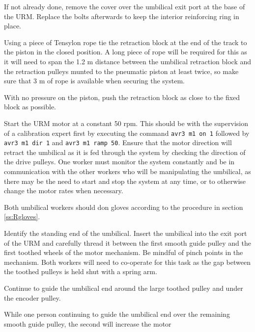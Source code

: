 \documentclass[11pt]{article}
\begin{document}
\begin{answerlist}
\item If not already done, remove the cover over the umbilical exit port at the base of the URM. Replace the bolts afterwards to keep the interior reinforcing ring in place. 
\item Using a piece of Tensylon rope tie the retraction block at the
  end of the track to the piston in the closed position. A long piece
  of rope will be required for this as it will need to span the 1.2 m
  distance between the umbilical retraction block and the retraction
  pulleys munted to the pneumatic piston at least twice, so make sure
  that 3 m of rope is available when securing the system.
\item With no pressure on the piston, push the retraction block as close to the fixed block as possible.
\item Start the URM motor at a constant 50 rpm. This should be with
  the supervision of a calibration expert first by executing the
  command \verb+avr3 m1 on 1+ followed by \verb+avr3 m1 dir 1+ and
  \verb+avr3 m1 ramp 50+. Ensure that the motor direction will retract
  the umbilical as it is fed through the system by checking the
  direction of the drive pulleys. One worker must monitor the system
  constantly and be in communication with the other workers who will
  be manipulating the umbilical, as there may be the need to start and
  stop the system at any time, or to otherwise change the motor rates
  when necessary.
\item Both umbilical workers should don gloves according to the
  procedure in section \ref{ss:Rgloves}.
\item Identify the standing end of the umbilical. Insert the umbilical
  into the exit port of the URM and carefully thread it between the
  first smooth guide pulley and the first toothed wheels of the motor
  mechanism. Be mindful of pinch points in the mechanism. Both workers
  will need to co-operate for this task as the gap between the toothed
  pulleys is held shut with a spring arm.
\item Continue to guide the umbilical end around the large toothed
  pulley and under the encoder pulley.
\item While one person continuing to guide the umbilical end over the
  remaining smooth guide pulley, the second will increase the motor

\end{answerlist}
\end{document}
